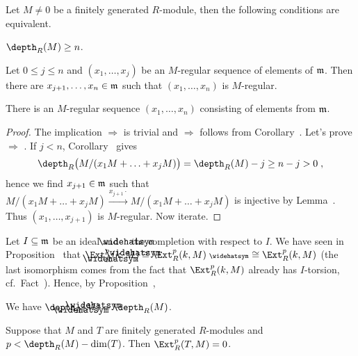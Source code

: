 \documentclass[a4paper,parskip=half,numbers=enddot, DIV=12]{scrreprt}
\begin{document}
\begin{prop}
	Let $M\neq 0$ be a finitely generated $R$-module, then the following conditions are equivalent.
	\begin{alphanumerate}
		\item $\depth_R(M)\geq n$.
		\item Let $0\leq j\leq n$ and $(x_1,\ldots,x_j)$ be an $M$-regular sequence of elements of $\mathfrak{m}$. Then there are $x_{j+1},\ldots,x_n\in\mathfrak{m}$ such that $(x_1,\ldots,x_n)$ is $M$-regular.
		\item There is an $M$-regular sequence $(x_1,\ldots,x_n)$ consisting of elements from $\mathfrak{m}$.
	\end{alphanumerate}
\end{prop}
\begin{proof}
	The implication  $\Rightarrow$   is trivial and  $\Rightarrow$  follows from Corollary~. Let's prove  $\Rightarrow$ . If $j<n$, Corollary~ gives
	\begin{align*}
		\depth_R\big(M/(x_1M+\ldots+x_jM)\big)=\depth_R(M)-j\geq n-j>0\;,
	\end{align*}
	hence we find $x_{j+1}\in\mathfrak{m}$ such that $M/(x_1M+\ldots+x_jM)\xrightarrow{x_{j+1}\cdot} M/(x_1M+\ldots+x_jM)$ is injective by Lemma~. Thus $(x_1,\ldots,x_{j+1})$ is $M$-regular. Now iterate.
\end{proof}
Let $I\subseteq \mathfrak{m}$ be an ideal and $\roof{\phantom{x}}$ the completion with respect to $I$. We have seen in Proposition~ that $\Ext_{\roof{R}}^p(k,\roof{M})\cong \Ext_R^p(k,M)^\complete \cong \Ext_R^p(k,M)$ (the last isomorphism comes from the fact that $\Ext_R^p(k,M)$ already has $I$-torsion, cf.\ Fact~). Hence, by Proposition~,
\begin{prop}
	We have $\depth_{\roof{R}}(\roof{M})=\depth_R(M)$.
\end{prop}
\begin{prop}[F.\ Ischebeck]
	Suppose that $M$ and $T$ are finitely generated $R$-modules and $p<\depth_R(M)-\dim(T)$. Then $\Ext_R^p(T,M)=0$.
\end{prop}
\end{document}

